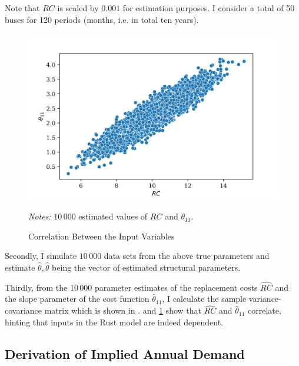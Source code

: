 \noindent Note that $RC$ is scaled by $0.001$ for estimation purposes. I consider a total of 50 buses for 120 periods (months, i.e. in total ten years).

\begin{figure}[t]
	\caption{Correlation Between the Input Variables}
    \label{correlation}
	\centering
	\vspace*{-4mm}
	\begin{centering}
	\includegraphics[scale=0.9]{../figures/correlation_rc_theta.png}
	\end{centering}

	\small
	\textit{Notes:} $10\,000$ estimated values of $RC$ and $\theta_{11}$.

\end{figure}


Secondly, I simulate $10\,000$ data sets from the above true parameters and estimate $\hat{\theta}, \hat{\theta}$ being the vector of estimated structural parameters.

Thirdly, from the $10\,000$ parameter estimates of the replacement costs $\widehat{RC}$ and the slope parameter of the cost function ${\hat{\theta}}_{11}$, I calculate the sample variance-covariance matrix which is shown in .  and \cref{correlation} show that $\widehat{RC}$ and ${\hat{\theta}}_{11}$ correlate, hinting that inputs in the Rust model are indeed dependent.

\subsection{Derivation of Implied Annual Demand}

